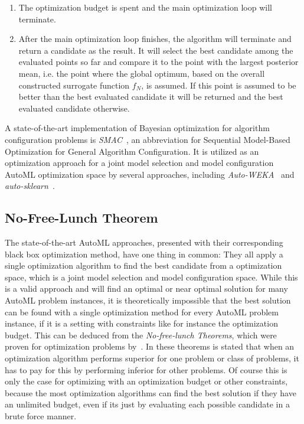 \begin{enumerate}
    \item The optimization budget is spent and the main optimization loop will terminate.
    \item After the main optimization loop finishes, the algorithm will terminate and return a candidate as the result.
    It will select the best candidate among the evaluated points so far and compare it to the point with the largest posterior mean, i.e. the point where the global optimum, based on the overall constructed surrogate function $f_N$, is assumed.
    If this point is assumed to be better than the best evaluated candidate it will be returned and the best evaluated candidate otherwise.
\end{enumerate}
A state-of-the-art implementation of Bayesian optimization for algorithm configuration problems is \textit{SMAC}~\cite{Hutter-SMAC}, an abbreviation for Sequential Model-Based Optimization for General Algorithm Configuration.
It is utilized as an optimization approach for a joint model selection and model configuration AutoML optimization space by several approaches, including \textit{Auto-WEKA}~\cite{Thornton-AutoWeka} and \textit{auto-sklearn}~\cite{Feurer-AutoSklearn}.

\subsection{No-Free-Lunch Theorem}
\label{sec:theory:optimization:lunch}
The state-of-the-art AutoML approaches, presented with their corresponding black box optimization method, have one thing in common: They all apply a single optimization algorithm to find the best candidate from a optimization space, which is a joint model selection and model configuration space.
While this is a valid approach and will find an optimal or near optimal solution for many AutoML problem instances, it is theoretically impossible that the best solution can be found with a single optimization method for every AutoML problem instance, if it is a setting with constraints like for instance the optimization budget.\newline
This can be deduced from the \textit{No-free-lunch Theorems}, which were proven for optimization problems by~\textcite{Wolpert-No-Free-Lunch-Theorems}.
In these theorems is stated that when an optimization algorithm performs superior for one problem or class of problems, it has to pay for this by performing inferior for other problems.
Of course this is only the case for optimizing with an optimization budget or other constraints, because the most optimization algorithms can find the best solution if they have an unlimited budget, even if its just by evaluating each possible candidate in a brute force manner.

